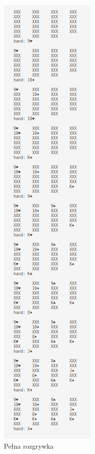\documentclass[12pt,a4paper]{article}
\begin{document}
\begin{figure}
    \centering
    \includegraphics[width=0.6\linewidth]{pelna-rozgrywka.png}
    \vspace{-15.0pt}
    \caption{Pełna rozgrywka}
    \label{fig:full-game}
\end{figure}
\end{document}
